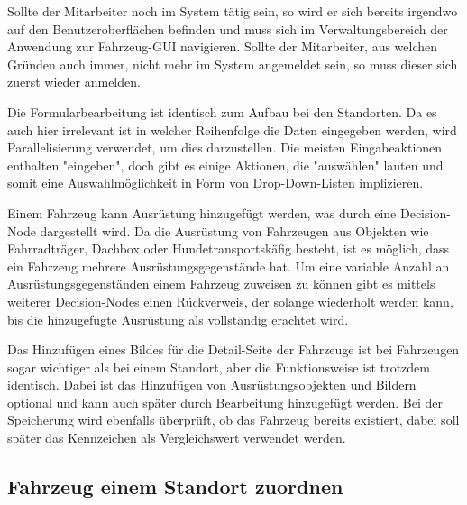 Sollte der Mitarbeiter noch im System tätig sein, so wird er sich bereits irgendwo auf den Benutzeroberflächen befinden und muss sich im Verwaltungsbereich der Anwendung zur Fahrzeug-GUI navigieren. Sollte der Mitarbeiter, aus welchen Gründen auch immer, nicht mehr im System angemeldet sein, so muss dieser sich zuerst wieder anmelden. 


Die Formularbearbeitung ist identisch zum Aufbau bei den Standorten. Da es auch hier irrelevant ist in welcher Reihenfolge die Daten eingegeben werden, wird Parallelisierung verwendet, um dies darzustellen. Die meisten Eingabeaktionen enthalten "eingeben", doch gibt es einige Aktionen, die "auswählen" lauten und somit eine Auswahlmöglichkeit in Form von Drop-Down-Listen implizieren.


Einem Fahrzeug kann Ausrüstung hinzugefügt werden, was durch eine Decision-Node dargestellt wird. Da die Ausrüstung von Fahrzeugen aus Objekten wie Fahrradträger, Dachbox oder Hundetransportskäfig besteht, ist es möglich, dass ein Fahrzeug mehrere Ausrüstungsgegenstände hat. Um eine variable Anzahl an Ausrüstungsgegenständen einem Fahrzeug zuweisen zu können gibt es mittels weiterer Decision-Nodes einen Rückverweis, der solange wiederholt werden kann, bis die hinzugefügte Ausrüstung als vollständig erachtet wird. 


Das Hinzufügen eines Bildes für die Detail-Seite der Fahrzeuge ist bei Fahrzeugen sogar wichtiger als bei einem Standort, aber die Funktionsweise ist trotzdem identisch. Dabei ist das Hinzufügen von Ausrüstungsobjekten und Bildern optional und kann auch später durch Bearbeitung hinzugefügt werden. Bei der Speicherung wird ebenfalls überprüft, ob das Fahrzeug bereits existiert, dabei soll später das Kennzeichen als Vergleichswert verwendet werden. 

\newpage

\subsection{Fahrzeug einem Standort zuordnen}

